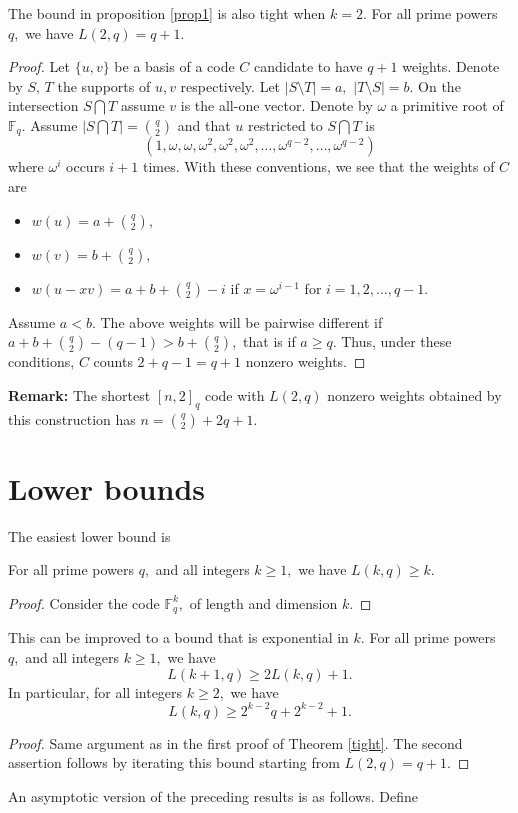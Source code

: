 \documentclass[12pt]{article}
\newcommand{\F}{\mathbb{F}}
\theoremstyle{definition}
\begin{document}
The bound in proposition \ref{prop1} is also tight when $k=2.$
{\theorem For all prime powers $q,$  we have
$L(2,q)= q+1.$
}
\begin{proof}
Let $\{u,v\}$ be a basis of a code $C$ candidate to have $q+1$ weights. Denote by $S,\,T$ the supports of $u,v$ respectively. Let $|S\setminus T|=a,$ $|T\setminus S|=b.$
On the intersection $S\bigcap T$ assume $v$ is the all-one vector. Denote by $\omega$ a primitive root of $\F_q.$ Assume $|S\bigcap T|={q \choose 2}$ and that $u$ restricted to $S\bigcap T$ is
$$(1,\omega, \omega, \omega^2,\omega^2,\omega^2,\dots,\omega^{q-2},\dots,\omega^{q-2}) $$
where $\omega^i$ occurs $i+1$ times. With these conventions, we see that the weights of $C$ are
\begin{itemize}
\item $w(u)=a+{q \choose 2},$
\item $w(v)=b+{q \choose 2},$
\item $w(u-xv)=a+b+ {q \choose 2}-i$ if $x=\omega^{i-1}$ for $i=1,2,\dots,q-1.$
\end{itemize}
Assume $a<b.$ The above weights will be pairwise different if $a+b+{q \choose 2}-(q-1)>b+{q \choose 2},$ that is if $a\ge q.$
Thus, under these conditions, $C$ counts $2+q-1=q+1$ nonzero weights.
\end{proof}

{\bf Remark:} The shortest $[n,2]_q$ code with $L(2,q)$ nonzero weights obtained by this construction has $n={q \choose 2}+2q+1.$

\section{Lower bounds}
The easiest lower bound is

{\prop For all prime powers $q,$ and all integers $k\ge 1,$ we have
$L(k,q)\ge k.$
}
\begin{proof}
Consider the code $\F_q^k,$ of length and dimension $k.$
\end{proof}

This can be improved to a bound that is exponential in $k.$
{\prop \label{expo} For all prime powers $q,$ and all integers $k\ge 1,$ we have
$$L(k+1,q)\ge 2L(k,q)+1.$$ In particular, for all integers $k\ge 2,$ we have $$L(k,q)\ge 2^{k-2}q+2^{k-2}+1.$$
} \vspace{-0.8cm}
\begin{proof}
Same argument as in the first proof of Theorem \ref{tight}. The second assertion follows by iterating this bound starting from $L(2,q)=q+1.$
\end{proof}
An asymptotic version of the preceding results is as follows. Define
\end{document}
